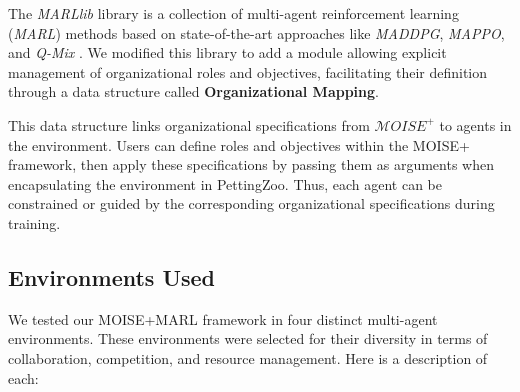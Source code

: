 \documentclass[sigconf,anonymous]{aamas}
\begin{document}
The \textit{MARLlib} library is a collection of multi-agent reinforcement learning (\textit{MARL}) methods based on state-of-the-art approaches like \textit{MADDPG}, \textit{MAPPO}, and \textit{Q-Mix} \cite{hu2021marlib}. We modified this library to add a module allowing explicit management of organizational roles and objectives, facilitating their definition through a data structure called \textbf{Organizational Mapping}.

This data structure links organizational specifications from $\mathcal{M}OISE^+$ to agents in the environment. Users can define roles and objectives within the MOISE+ framework, then apply these specifications by passing them as arguments when encapsulating the environment in PettingZoo. Thus, each agent can be constrained or guided by the corresponding organizational specifications during training.

\subsection{Environments Used}

We tested our MOISE+MARL framework in four distinct multi-agent environments. These environments were selected for their diversity in terms of collaboration, competition, and resource management. Here is a description of each:
\end{document}
